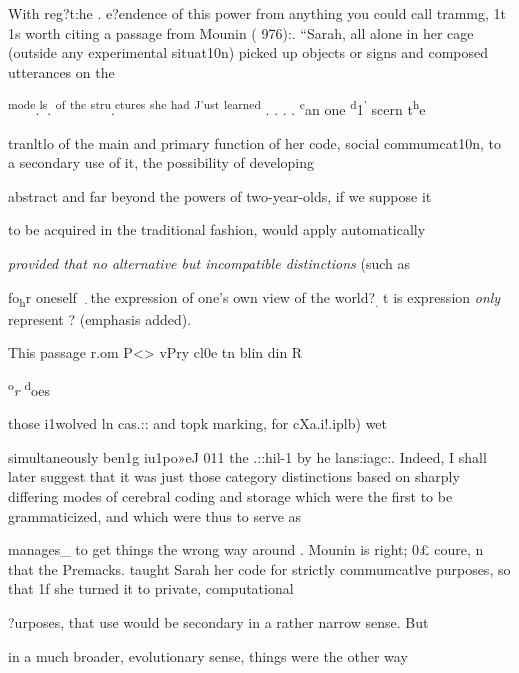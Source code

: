 With reg?t:he . e?endence of this power from anything you could call trammg, 1t 1s worth citing a passage from Mounin ( 976):. ``Sarah, all alone in her cage (outside any experimental situa\-t10n) picked up objects or signs and composed utterances on the

\textsuperscript{mod}\textsuperscript{e}.\textsuperscript{l}\textsuperscript{s}. \textsuperscript{of} \textsuperscript{the} \textsuperscript{str}\textsuperscript{u}.\textsuperscript{ctures} \textsuperscript{she} \textsuperscript{had} \textsuperscript{J}\textsuperscript{'ust} \textsuperscript{learned} . . . . \textsuperscript{c}an one \textsuperscript{d}1\textsuperscript{'} scern t\textsuperscript{h}e

tranltlo of the main and primary function of her code, social com\-mumcat10n, to a secondary use of it, the possibility of developing

abstract and far beyond the powers of two-year-olds, if we suppose it

to be acquired in the traditional fashion, would apply automatically

\textit{provided that no alternative but incompatible distinctions }(such as

fo\textsubscript{h}\textsubscript{{\textquotedbl}}r oneself \textsubscript{·}the expression of one's own view of the world?\textsubscript{. }t is expression \textit{only} represent ? (emphasis added).

This passage r.om P{\textless}{\textgreater} vPry cl0e tn blin din R

\textsuperscript{o}\textit{r} \textsuperscript{d}oes

those i1wolved ln  cas.:: and topk marking, for cXa.i!.iplb) wet

simultaneously ben1g iu1po»eJ 011 the .::hil-1 by he lans:iagc:. Indeed, I shall later suggest that it was just those category distinctions based on sharply differing modes of cerebral coding and storage which were the first to be grammaticized, and which were thus to serve as

manages\_ to get things the wrong way around . Mounin is right; 0£ coure, n that the Premacks. taught Sarah her code for strictly com\-mumcatlve purposes, so that 1f she turned it to private, computational

?urposes, that use would be secondary in a rather narrow sense. But

in a much broader, evolutionary sense, things were the other way

